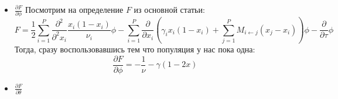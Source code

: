 \documentclass[10pt]{article}
\theoremstyle{plain}
\theoremstyle{remark}
\begin{document}
\begin{itemize}
  \item $\boxed{\frac{\partial F}{\partial \phi}}$
  Посмотрим на определение $F$ из основной статьи:
  \begin{equation*}
    F = \frac{1}{2} \sum_{i = 1}^{P} \frac{\partial^2}{\partial^2 x_i} \frac{x_i(1 - x_i)}{\nu_i} \phi -
    \sum_{i = 1}^P \frac{\partial}{\partial x_i} \left(\gamma_i x_i(1 - x_i) + \sum_{j = 1}^P M_{i \leftarrow j} (x_j - x_i) \right)\phi -
    \frac{\partial}{\partial \tau } \phi
  \end{equation*}
  Тогда, сразу воспользовавшись тем что популяция у нас пока одна:
  \begin{equation*}
    \frac{\partial F}{\partial \phi} = -\frac{1}{\nu} -\gamma (1 - 2x)
  \end{equation*}

  \item $\boxed{\frac{\partial F}{\partial \theta}}$


\end{itemize}
\end{document}
